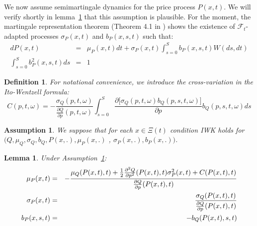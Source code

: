 \documentclass{article}
\newtheorem{lemma}[theorem]{Lemma}
\newtheorem{definition}{Definition}
\newtheorem{assumption}{Assumption}
\begin{document}
\bigskip

We now assume semimartingale dynamics for the price process $P(x,t)$. We
will verify shortly in lemma~\ref{lemma::para} that this assumption is
plausible. For the moment, the martingale representation theorem (Theorem
4.1 in \cite{CT06}) shows the existence of $\mathcal{F}_{t}$-adapted
processes $\sigma _{P}(x,t)$ and $b_{P}(x,s,t)$ such that:%
\begin{eqnarray}
dP(x,t) &=&\mu _{P}(x,t)dt+\sigma _{P}(x,t)\int_{s=0}^{S}b_{P}(x,s,t)W(ds,dt)
\label{equforP} \\
\int_{s=0}^{S}b_{P}^{2}(x,s,t)ds &=&1
\end{eqnarray}


\begin{definition}
For notational convenience, we introduce the cross-variation in the
Ito-Wentzell formula:%
\begin{equation*}
C(p,t,\omega )=-\frac{\sigma _{Q}(p,t,\omega)}{\frac{\partial Q}{\partial p}%
(p,t,\omega)}\int_{s=0}^{S}\frac{\partial \lbrack \sigma _{Q}(p,t,\omega
)b_{Q}(p,s,t,\omega )]}{\partial p}b_{Q}(p,s,t,\omega )ds
\end{equation*}
\end{definition}


\begin{assumption}
\label{ass::iwk_condition_Q} We suppose that for each $x\in \Xi (t)$
condition IWK holds for $(Q,\mu _{Q},\sigma _{Q},b_{Q},P(x,.),\mu _{P}(x,.)$%
, $\sigma _{P}(x,.),b_{P}(x,.))$.
\end{assumption}



\begin{lemma}
\label{lemma::para} Under Assumption~\ref{ass::iwk_condition_Q}:
\begin{eqnarray}
\mu _{P}(x,t) &=&-\frac{\mu _{Q}(P(x,t),t)+\frac{1}{2}\frac{\partial ^{2}Q}{%
\partial p^{2}}(P(x,t),t)\sigma _{P}^{2}(x,t)+C(P(x,t),t)}{\frac{\partial Q}{%
\partial p}(P(x,t),t)}  \label{mu_Px} \\
\sigma _{P}(x,t) &=&\frac{\sigma _{Q}(P(x,t),t)}{\frac{\partial Q}{\partial p%
}(P(x,t),t)}  \label{sigma_P} \\
b_{P}(x,s,t) &=&-b_{Q}(P(x,t),s,t)  \label{b_P}
\end{eqnarray}
\end{lemma}
\end{document}
